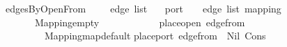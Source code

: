 \ edgesByOpenFrom\ {\isacharcolon}{\isacharcolon}\ {\isachardoublequoteopen}{\isacharparenleft}\ \ \ edge\ list\isanewline
{}\ {\isacharparenleft}{\isacharparenleft}\ \ port{\isacharcomma}\ {\isacharparenleft}\ \ \ edge\ list{\isacharparenright}\ mapping{\isachardoublequoteclose}\isanewline
\ \ \isanewline
\ \ \ \ {\isachardoublequoteopen}\ {\isacharbrackleft}{\isacharbrackright}\ {\isacharequal}\ Mapping{\isachardot}empty{\isachardoublequoteclose}\isanewline
\ \ {\isacharbar}\ {\isachardoublequoteopen}\ {\isacharparenleft}\ {\isacharequal}\isanewline
\ \ \ \ {\isacharparenleft}\ \ place{\isacharunderscore}open\ {\isacharparenleft}edge{\isacharunderscore}from\ \isanewline
\ \ \ \ \ \ \ \ \ Mapping{\isachardot}map{\isacharunderscore}default\isanewline
{}place{\isacharunderscore}port\ {\isacharparenleft}edge{\isacharunderscore}from\ \ Nil\ {\isacharparenleft}Cons\ \ {\isacharparenleft}\ \isanewline
\ \ \ \ \ \ \ \ \ \ 
